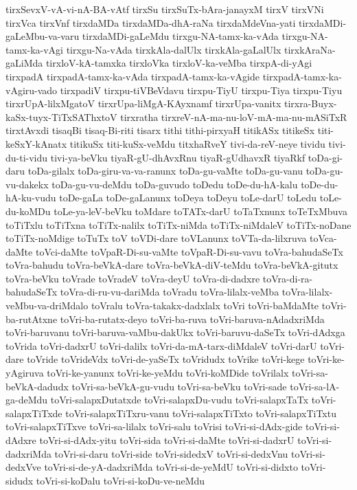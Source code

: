 {tirxSevxV-vA-vi-nA-BA-vAtf
tirxSu
tirxSuTx-bAra-janayxM
tirxV
tirxVNi
tirxVca
tirxVnf
tirxdaMDa
tirxdaMDa-dhA-raNa
tirxdaMdeVna-yati
tirxdaMDi-gaLeMbu-va-varu
tirxdaMDi-gaLeMdu
tirxgu-NA-tamx-ka-vAda
tirxgu-NA-tamx-ka-vAgi
tirxgu-Na-vAda
tirxkAla-dalUlx
tirxkAla-gaLalUlx
tirxkAraNa-gaLiMda
tirxloV-kA-tamxka
tirxloVka
tirxloV-ka-veMba
tirxpA-di-yAgi
tirxpadA
tirxpadA-tamx-ka-vAda
tirxpadA-tamx-ka-vAgide
tirxpadA-tamx-ka-vAgiru-vado
tirxpadiV
tirxpu-tiVBeVdavu
tirxpu-TiyU
tirxpu-Tiya
tirxpu-Tiyu
tirxrUpA-lilxMgatoV
tirxrUpa-liMgA-KAyxnamf
tirxrUpa-vanitx
tirxra-Buyx-kaSx-tuyx-TiTxSAThxtoV
tirxratha
tirxreV-nA-ma-nu-loV-mA-ma-nu-mASiTxR
tirxtAvxdi
tisaqBi
tisaq-Bi-riti
tisarx
tithi
tithi-pirxyaH
titikASx
titikeSx
titi-keSxY-kAnatx
titikuSx
titi-kuSx-veMdu
titxhaRveY
tivi-da-reV-neye
tividu
tivi-du-ti-vidu
tivi-ya-beVku
tiyaR-gU-dhAvxRnu
tiyaR-gUdhavxR
tiyaRkf
toDa-gi-daru
toDa-gilalx
toDa-giru-va-va-ranunx
toDa-gu-vaMte
toDa-gu-vanu
toDa-gu-vu-dakekx
toDa-gu-vu-deMdu
toDa-guvudo
toDedu
toDe-du-hA-kalu
toDe-du-hA-ku-vudu
toDe-gaLa
toDe-gaLanunx
toDeya
toDeyu
toLe-darU
toLedu
toLe-du-koMDu
toLe-ya-leV-beVku
toMdare
toTATx-darU
toTaTxnunx
toTeTxMbuva
toTiTxlu
toTiTxna
toTiTx-nalilx
toTiTx-niMda
toTiTx-niMdaleV
toTiTx-noDane
toTiTx-noMdige
toTuTx
toV
toVDi-dare
toVLanunx
toVTa-da-lilxruva
toVca-daMte
toVci-daMte
toVpaR-Di-su-vaMte
toVpaR-Di-su-vavu
toVra-bahudaSeTx
toVra-bahudu
toVra-beVkA-dare
toVra-beVkA-diV-teMdu
toVra-beVkA-gitutx
toVra-beVku
toVrade
toVradeV
toVra-deyU
toVra-di-dadxre
toVra-di-ra-bahudaSeTx
toVra-di-ru-vu-dariMda
toVradu
toVra-lilalx-veMba
toVra-lilalx-veMbu-va-driMdalo
toVralu
toVra-takakx-dadxlalx
toVri
toVri-baMdaMte
toVri-ba-rutAtxne
toVri-ba-rutatx-deyo
toVri-ba-ruva
toVri-baruva-nAdadxriMda
toVri-baruvanu
toVri-baruva-vaMbu-dakUkx
toVri-baruvu-daSeTx
toVri-dAdxga
toVrida
toVri-dadxrU
toVri-dalilx
toVri-da-mA-tarx-diMdaleV
toVri-darU
toVri-dare
toVride
toVrideVdx
toVri-de-yaSeTx
toVridudx
toVrike
toVri-kege
toVri-ke-yAgiruva
toVri-ke-yanunx
toVri-ke-yeMdu
toVri-koMDide
toVrilalx
toVri-sa-beVkA-dadudx
toVri-sa-beVkA-gu-vudu
toVri-sa-beVku
toVri-sade
toVri-sa-lA-ga-deMdu
toVri-salapxDutatxde
toVri-salapxDu-vudu
toVri-salapxTaTx
toVri-salapxTiTxde
toVri-salapxTiTxru-vanu
toVri-salapxTiTxto
toVri-salapxTiTxtu
toVri-salapxTiTxve
toVri-sa-lilalx
toVri-salu
toVrisi
toVri-si-dAdx-gide
toVri-si-dAdxre
toVri-si-dAdx-yitu
toVri-sida
toVri-si-daMte
toVri-si-dadxrU
toVri-si-dadxriMda
toVri-si-daru
toVri-side
toVri-sidedxV
toVri-si-dedxVnu
toVri-si-dedxVve
toVri-si-de-yA-dadxriMda
toVri-si-de-yeMdU
toVri-si-didxto
toVri-sidudx
toVri-si-koDalu
toVri-si-koDu-ve-neMdu
}
